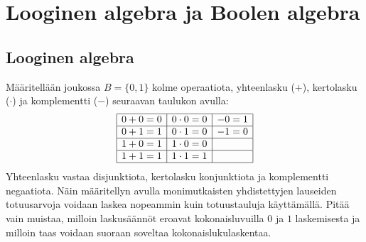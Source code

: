 \chapter{Looginen algebra ja Boolen algebra}%

\section{Looginen algebra}

%
%

Määritellään joukossa $B=\{0, 1\}$ kolme operaatiota, yhteenlasku ($+$), kertolasku ($\cdot$) ja komplementti ($-$) seuraavan taulukon avulla:
\[
\begin{array}{|c|c|c|}
\hline
0+0=0 & 0\cdot0=0 & - 0=1\\
\hline
0+1=1 & 0\cdot1=0 & - 1=0\\
\hline
1+0=1 & 1\cdot0=0 & \\
\hline
1+1=1 & 1\cdot1=1 & \\
\hline
\end{array}
\]
Yhteenlasku vastaa disjunktiota, kertolasku konjunktiota ja komplementti negaatiota. Näin määritellyn  avulla monimutkaisten yhdistettyjen lauseiden totuusarvoja voidaan laskea nopeammin kuin totuustauluja käyttämällä. Pitää vain muistaa, milloin lasku\-sään\-nöt eroavat kokonaisluvuilla $0$ ja $1$ laskemisesta ja milloin taas voidaan suoraan soveltaa kokonaislukulaskentaa.


